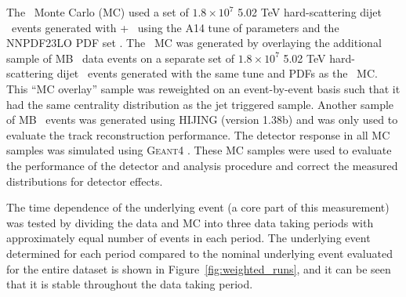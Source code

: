 The \pp\ Monte Carlo (MC) used a set of $1.8\times10^7$ 5.02 TeV hard-scattering dijet \pp\ events generated with \powheg{}+\pythiaeight\ \cite{Nason:2004rx,Sjostrand:2014zea} using the A14 tune of parameters \cite{ATLAS2014021} and the NNPDF23LO PDF set \cite{Ball:2012cx}.
The \pbpb\ MC was generated by overlaying the additional sample of MB \pbpb\ data events on a separate set of $1.8\times10^7$ 5.02 TeV hard-scattering dijet \pp\ events generated with the same tune and PDFs as the \pp\ MC.
This ``MC overlay'' sample was reweighted on an event-by-event basis such that it had the same centrality distribution as the jet triggered sample.
Another sample of MB \pbpb\ events was generated using HIJING (version 1.38b) \cite{Wang:1991hta} and was only used to evaluate the track reconstruction performance.
The detector response in all MC samples was simulated using \textsc{Geant4} \cite{Agostinelli:2002hh,Aad:2010ah}.
These MC samples were used to evaluate the performance of the detector and analysis procedure and correct the measured distributions for detector effects.


%

The time dependence of the underlying event (a core part of this measurement) was tested by dividing the data and MC into three data taking periods with approximately equal number of events in each period.
The underlying event determined for each period compared to the nominal underlying event evaluated for the entire dataset is shown in Figure~\ref{fig:weighted_runs}, and it can be seen that it is stable throughout the data taking period.

